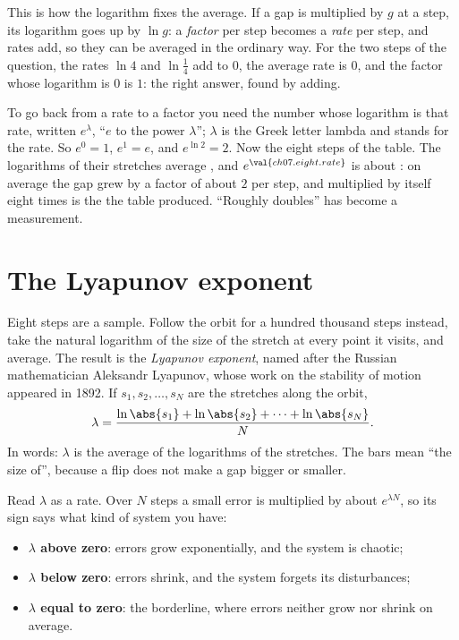 This is how the logarithm fixes the average. If a gap is multiplied by $g$
at a step, its logarithm goes up by $\ln g$: a \emph{factor} per step becomes
a \emph{rate} per step, and rates add, so they can be averaged in the
ordinary way. For the two steps of the question, the rates $\ln 4$ and
$\ln\tfrac14$ add to $0$, the average rate is $0$, and the factor whose
logarithm is $0$ is $1$: the right answer, found by adding.

To go back from a rate to a factor you need the number whose logarithm is
that rate, written $e^{\lambda}$, \enquote{$e$ to the power $\lambda$};
$\lambda$ is the Greek letter lambda and stands for the rate. So $e^{0} = 1$,
$e^{1} = e$, and $e^{\ln 2} = 2$. Now the eight steps of the table. The
logarithms of their stretches average , and
$e^{\val{ch07.eight.rate}}$ is about : on average the
gap grew by a factor of about $2$ per step, and 
multiplied by itself eight times is the  the table
produced. \enquote{Roughly doubles} has become a measurement.

\section{The Lyapunov exponent}
\label{sec:ch07-exponent}

\noindent
Eight steps are a sample. Follow the orbit for a hundred thousand steps
instead, take the natural logarithm of the size of the stretch at every point
it visits, and average. The result is the \emph{Lyapunov exponent}, named
after the Russian mathematician Aleksandr Lyapunov, whose work on the
stability of motion appeared in 1892. If $s_1, s_2, \dots, s_N$ are the
stretches along the orbit,
\[ \lambda = \frac{\ln\abs{s_1} + \ln\abs{s_2} + \dots + \ln\abs{s_N}}{N}. \]
In words: $\lambda$ is the average of the logarithms of the stretches. The
bars mean \enquote{the size of}, because a flip does not make a gap bigger or
smaller.

Read $\lambda$ as a rate. Over $N$ steps a small error is multiplied by
about $e^{\lambda N}$, so its sign says what kind of system you have:

\begin{itemize}
\item \textbf{$\lambda$ above zero}: errors grow exponentially, and the system
  is chaotic;
\item \textbf{$\lambda$ below zero}: errors shrink, and the system forgets its
  disturbances;
\item \textbf{$\lambda$ equal to zero}: the borderline, where errors neither
  grow nor shrink on average.
\end{itemize}

